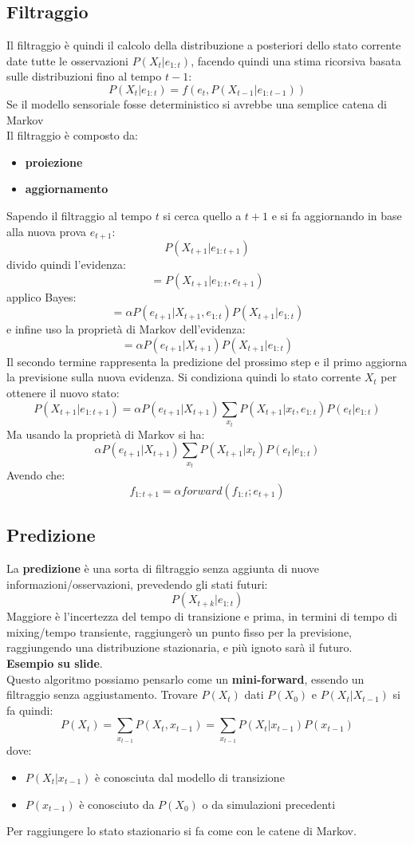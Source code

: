 \documentclass[a4paper,12pt, oneside]{book}
\begin{document}
\subsection{Filtraggio}
Il filtraggio è quindi il calcolo della distribuzione a posteriori dello stato
corrente date tutte le osservazioni $P(X_t|e_{1:t})$, facendo quindi una stima
ricorsiva basata sulle distribuzioni fino al tempo $t-1$:
\[P(X_t|e_{1:t})=f(e_t,P(X_{t-1}|e_{1:t-1}))\]
Se il modello sensoriale fosse deterministico si avrebbe una semplice catena di
Markov\\
Il filtraggio è composto da:
\begin{itemize}
  \item \textbf{proiezione}
  \item \textbf{aggiornamento}
\end{itemize}
Sapendo il filtraggio al tempo $t$ si cerca quello a $t+1$ e si fa aggiornando
in base alla nuova prova $e_{t+1}$:
\[P(X_{t+1}|e_{1:t+1})\]
divido quindi l'evidenza:
\[=P(X_{t+1}|e_{1:t},e_{t+1})\]
applico Bayes:
\[=\alpha P(e_{t+1}|X_{t+1},e_{1:t})P(X_{t+1}|e_{1:t})\]
e infine uso la proprietà di Markov dell'evidenza:
\[=\alpha P(e_{t+1}|X_{t+1})P(X_{t+1}|e_{1:t})\]
Il secondo termine rappresenta la predizione del prossimo step e il primo
aggiorna la previsione sulla nuova evidenza. Si condiziona quindi lo stato
corrente $X_t$ per ottenere il nuovo stato:
\[P(X_{t+1}|e_{1:t+1})=\alpha
  P(e_{t+1}|X_{t+1})\sum_{x_t}P(X_{t+1}|x_t,e_{1:t})P(e_t|e_{1:t})\]
Ma usando la proprietà di Markov si ha:
\[\alpha
  P(e_{t+1}|X_{t+1})\sum_{x_t}P(X_{t+1}|x_t)P(e_t|e_{1:t})\]
Avendo che:
\[f_{1:t+1}=\alpha forward(f_{1:t};e_{t+1})\]
\subsection{Predizione}
La \textbf{predizione} è una sorta di filtraggio senza aggiunta di nuove
informazioni/osservazioni, prevedendo gli stati futuri:
\[P(X_{t+k}|e_{1:t})\]
Maggiore è l'incertezza del tempo di transizione e prima, in termini di tempo di
mixing/tempo transiente, raggiungerò un punto
fisso per la previsione, raggiungendo una distribuzione stazionaria, e più
ignoto sarà il futuro.\\
\textbf{Esempio su slide}.\\
Questo algoritmo possiamo pensarlo come un \textbf{mini-forward}, essendo un
filtraggio senza aggiustamento. Trovare $P(X_t)$ dati $P(X_0)$ e
$P(X_t|X_{t-1})$ si fa quindi:
\[P(X_t)=\sum_{x_{t-1}}P(X_t,x_{t-1})=\sum_{x_{t-1}}P(X_t|x_{t-1})P(x_{t-1})\]
dove:
\begin{itemize}
  \item $P(X_t|x_{t-1})$ è conosciuta dal modello di transizione
  \item $P(x_{t-1})$ è conosciuto da $P(X_0)$ o da simulazioni precedenti
\end{itemize}
Per raggiungere lo stato stazionario si fa come con le catene di Markov.
\end{document}
